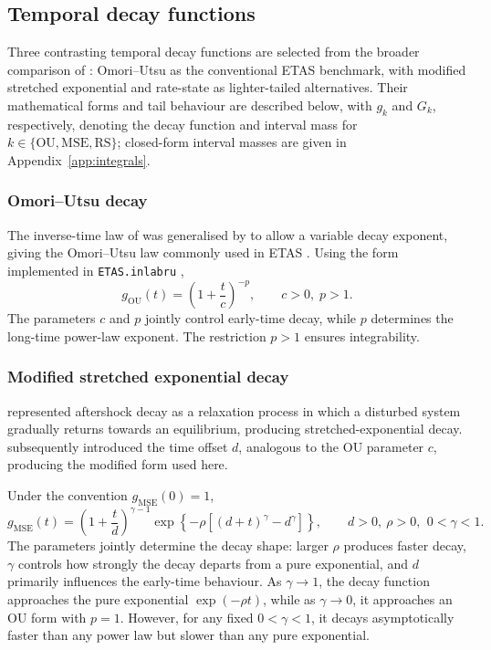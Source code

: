 \documentclass{statsmsc}
\begin{document}
\subsection{Temporal decay functions} \label{sec:decay}
Three contrasting temporal decay functions are selected from the broader comparison of \citet{hainzl2017testing}: Omori--Utsu as the conventional ETAS benchmark, with modified stretched exponential and rate-state as lighter-tailed alternatives. Their mathematical forms and tail behaviour are described below, with $g_k$ and $G_k$, respectively, denoting the decay function and interval mass for $k \in \{\mathrm{OU}, \mathrm{MSE}, \mathrm{RS}\}$; closed-form interval masses are given in Appendix~\ref{app:integrals}.

\subsubsection{Omori--Utsu decay} \label{sec:ou}

The inverse-time law of \citet{omori1894aftershocks} was generalised by \citet{utsu1961statistical} to allow a variable decay exponent, giving the Omori--Utsu law commonly used in ETAS \citep{ogata1988statistical}. Using the form implemented in \texttt{ETAS.inlabru} \citep{naylor2023bayesian}, 
\begin{equation*} 
g_{\mathrm{OU}}(t)  = \left(1+\frac{t}{c}\right)^{-p}, \qquad c>0, \;p>1.
\end{equation*}
The parameters $c$ and $p$ jointly control early-time decay, while $p$ determines the long-time power-law exponent. The restriction $p>1$ ensures integrability.  

\subsubsection{Modified stretched exponential decay} \label{sec:msexp}

\citet{kisslinger1993stretched} represented aftershock decay as a relaxation process in which a disturbed system gradually returns towards an equilibrium, producing stretched-exponential decay. \citet{gross1994tests} subsequently introduced the time offset $d$, analogous to the OU parameter $c$, producing the modified form used here.  

Under the convention $g_{\mathrm{MSE}}(0) = 1$, 
\begin{equation*} 
g_{\mathrm{MSE}}(t) = \left(1+\frac{t}{d} \right)^{\gamma-1} \exp \left\{ -\rho \left[(d +t)^{\gamma} - d^{\gamma}\right]\right\}, \qquad d >0, \: \rho >0, \: \,0< \gamma<1.
\end{equation*}
The parameters jointly determine the decay shape: larger $\rho$ produces faster decay, $\gamma$ controls how strongly the decay departs from a pure exponential, and $d$ primarily influences the early-time behaviour. As $\gamma \to 1$, the decay function approaches the pure exponential $\exp(-\rho t)$, while as $\gamma \to 0$, it approaches an OU form with $p = 1$. However, for any fixed $0 < \gamma <1$, it decays asymptotically faster than any power law but slower than any pure exponential.
 
\end{document}

